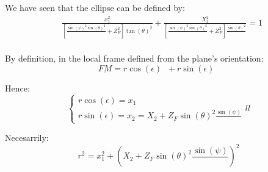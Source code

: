 \documentclass[a4paper,11pt,twoside,titlepage,openright]{book}
\numberwithin{equation}{section}
\newcommand{\ud}[1]{\underline{#1}}
\newcommand{\lt}{\left}
\newcommand{\rt}{\right}
\DeclareMathOperator{\ei}{\underline{e}_1}
\DeclareMathOperator{\et}{\underline{e}_2}
\DeclareMathOperator{\DD}{\cos(\theta)^2 - \sin(\psi)^2}
\begin{document}
We have seen that the ellipse can be defined by:
$$
\begin{array}{lll}
	& \frac{x_1^2}{\lt[\frac{\sin(\psi)^2\sin(\theta)^2}{\DD} + Z_F^2\rt]\tan(\theta)^2} + \frac{X_2^2}{\lt[\frac{\sin(\psi)^2\sin(\theta)^2}{\DD} + Z_F^2\rt]\frac{\sin(\theta)^2}{\DD}} = 1\\
\end{array}
$$

By definition, in the local frame defined from the plane's orientation:
$$
\ud{FM} = r\cos(\epsilon)\ei + r\sin(\epsilon)\et
$$

Hence:
$$
\lt\{
	\begin{array}{ll}
		r\cos(\epsilon) = x_1\\
		r\sin(\epsilon) = x_2 = X_2 + Z_F\sin(\theta)^2 \frac{\sin(\psi)}{\DD}
	\end{array}{ll}
\rt.
$$

Necesarrily:
$$
r^2 = x_1^2 + \lt(X_2 + Z_F\sin(\theta)^2 \frac{\sin(\psi)}{\DD}\rt)^2
$$







\end{document}
